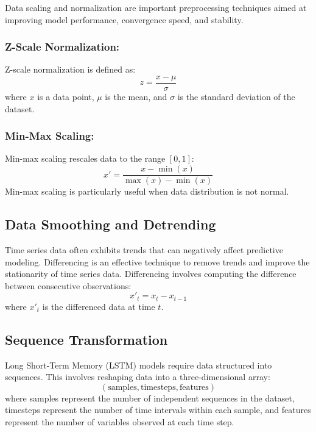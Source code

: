 Data scaling and normalization are important preprocessing techniques aimed at improving model performance, convergence speed, and stability.

\subsubsection{Z-Scale Normalization:}
Z-scale normalization is defined as:
\begin{equation}
z = \frac{x - \mu}{\sigma}
\label{eq:z_scale}
\end{equation}
where \(x\) is a data point, \(\mu\) is the mean, and \(\sigma\) is the standard deviation of the dataset. %

\subsubsection{Min-Max Scaling:}
Min-max scaling rescales data to the range \([0,1]\):
\begin{equation}
x' = \frac{x - \min(x)}{\max(x) - \min(x)}
\label{eq:min_max}
\end{equation}
Min-max scaling is particularly useful when data distribution is not normal.


\subsection{Data Smoothing and Detrending}

Time series data often exhibits trends that can negatively affect predictive modeling. Differencing is an effective technique to remove trends and improve the stationarity of time series data. Differencing involves computing the difference between consecutive observations:
\begin{equation}
x'_t = x_t - x_{t-1}
\label{eq:differencing}
\end{equation}
where \(x'_t\) is the differenced data at time \(t\).

\subsection{Sequence Transformation}

Long Short-Term Memory (LSTM) models require data structured into sequences. This involves reshaping data into a three-dimensional array:
\begin{equation}
(\text{samples}, \text{timesteps}, \text{features})
\label{eq:reshaping}
\end{equation}
where samples represent the number of independent sequences in the dataset, timesteps represent the number of time intervals within each sample, and features represent the number of variables observed at each time step.

